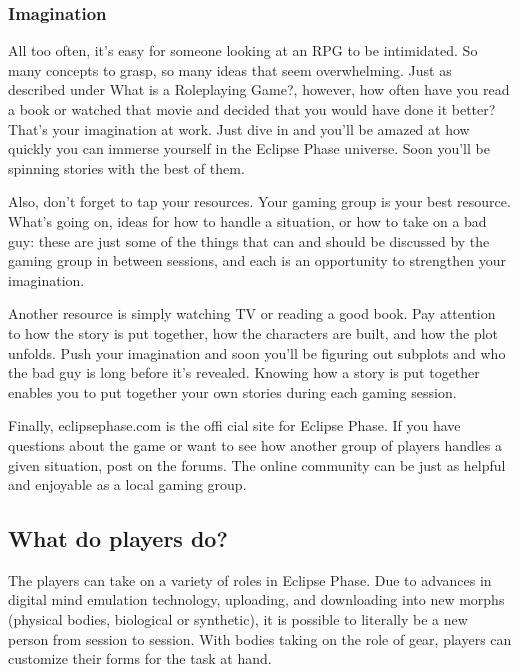 \subsubsection{Imagination} \label{sec:imagination} 

All too often, it's easy for someone looking at an RPG to be intimidated. So many concepts to grasp, so many ideas that seem overwhelming. Just as described under What is a Roleplaying Game?, however, how often have you read a book or watched that movie and decided that you would have done it better? That's your imagination at work. Just dive in and you'll be amazed at how quickly you can immerse yourself in the Eclipse Phase universe. Soon you'll be spinning stories with the best of them. 

Also, don't forget to tap your resources. Your gaming group is your best resource. What's going on, ideas for how to handle a situation, or how to take on a bad guy: these are just some of the things that can and should be discussed by the gaming group in between sessions, and each is an opportunity to strengthen your imagination. 

Another resource is simply watching TV or reading a good book. Pay attention to how the story is put together, how the characters are built, and how the plot unfolds. Push your imagination and soon you'll be figuring out subplots and who the bad guy is long before it's revealed. Knowing how a story is put together enables you to put together your own stories during each gaming session. 

Finally, eclipsephase.com is the offi cial site for Eclipse Phase. If you have questions about the game or want to see how another group of players handles a given situation, post on the forums. The online community can be just as helpful and enjoyable as a local gaming group. 



\subsection{What do players do?} \label{sec:what-do-players} 

The players can take on a variety of roles in Eclipse Phase. Due to advances in digital mind emulation technology, uploading, and downloading into new morphs (physical bodies, biological or synthetic), it is possible to literally be a new person from session to session. With bodies taking on the role of gear, players can customize their forms for the task at hand. 



